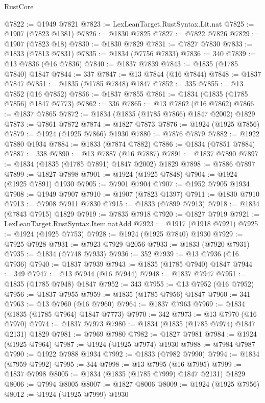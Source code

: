 \begin{lexlean}{RustCore}
\begin{coremodule}
@7822 := @1949 @7821
@7823 := LexLeanTarget.RustSyntax.Lit.nat
@7825 := @1907 (@7823 @1381)
@7826 := @1830 @7825
@7827 := @7822 @7826
@7829 := @1907 (@7823 @18)
@7830 := @1830 @7829
@7831 := @7827 @7830
@7833 := @1833 (@7813 @7831)
@7835 := @1834 (@7756 @7833)
@7836 := 340
@7839 := @13 @7836 (@16 @7836)
@7840 := @1837 @7839
@7843 := @1835 (@1785 @7840) @1847
@7844 := 337
@7847 := @13 @7844 (@16 @7844)
@7848 := @1837 @7847
@7851 := @1835 (@1785 @7848) @1847
@7852 := 335
@7855 := @13 @7852 (@16 @7852)
@7856 := @1837 @7855
@7861 := @1834 (@1835 (@1785 @7856) @1847 @7773)
@7862 := 336
@7865 := @13 @7862 (@16 @7862)
@7866 := @1837 @7865
@7872 := @1834 (@1835 (@1785 @7866) @1847 @2002) @1829
@7873 := @7861 @7872
@7874 := @1827 @7873
@7876 := @1924 (@1925 @7856)
@7879 := @1924 (@1925 @7866) @1930
@7880 := @7876 @7879
@7882 := @1922 @7880 @1934
@7884 := @1833 (@7874 @7882)
@7886 := @1834 (@7851 @7884)
@7887 := 338
@7890 := @13 @7887 (@16 @7887)
@7891 := @1837 @7890
@7897 := @1834 (@1835 (@1785 @7891) @1847 @2002) @1829
@7898 := @7886 @7897
@7899 := @1827 @7898
@7901 := @1924 (@1925 @7848)
@7904 := @1924 (@1925 @7891) @1930
@7905 := @7901 @7904
@7907 := @1952 @7905 @1934
@7908 := @1949 @7907
@7910 := @1907 (@7823 @1397)
@7911 := @1830 @7910
@7913 := @7908 @7911 @7830
@7915 := @1833 (@7899 @7913)
@7918 := @1834 (@7843 @7915) @1829
@7919 := @7835 @7918
@7920 := @1827 @7919
@7921 := LexLeanTarget.RustSyntax.Item.natAdd
@7923 := @1917 (@1918 @7921)
@7925 := @1924 (@1925 @7753)
@7928 := @1924 (@1925 @7840) @1930
@7929 := @7925 @7928
@7931 := @7923 @7929 @2056
@7933 := @1833 (@7920 @7931)
@7935 := @1834 (@7748 @7933)
@7936 := 352
@7939 := @13 @7936 (@16 @7936)
@7940 := @1837 @7939
@7943 := @1835 (@1785 @7940) @1847
@7944 := 349
@7947 := @13 @7944 (@16 @7944)
@7948 := @1837 @7947
@7951 := @1835 (@1785 @7948) @1847
@7952 := 343
@7955 := @13 @7952 (@16 @7952)
@7956 := @1837 @7955
@7959 := @1835 (@1785 @7956) @1847
@7960 := 341
@7963 := @13 @7960 (@16 @7960)
@7964 := @1837 @7963
@7969 := @1834 (@1835 (@1785 @7964) @1847 @7773)
@7970 := 342
@7973 := @13 @7970 (@16 @7970)
@7974 := @1837 @7973
@7980 := @1834 (@1835 (@1785 @7974) @1847 @2131) @1829
@7981 := @7969 @7980
@7982 := @1827 @7981
@7984 := @1924 (@1925 @7964)
@7987 := @1924 (@1925 @7974) @1930
@7988 := @7984 @7987
@7990 := @1922 @7988 @1934
@7992 := @1833 (@7982 @7990)
@7994 := @1834 (@7959 @7992)
@7995 := 344
@7998 := @13 @7995 (@16 @7995)
@7999 := @1837 @7998
@8005 := @1834 (@1835 (@1785 @7999) @1847 @2131) @1829
@8006 := @7994 @8005
@8007 := @1827 @8006
@8009 := @1924 (@1925 @7956)
@8012 := @1924 (@1925 @7999) @1930

\end{coremodule}
\end{lexlean}
